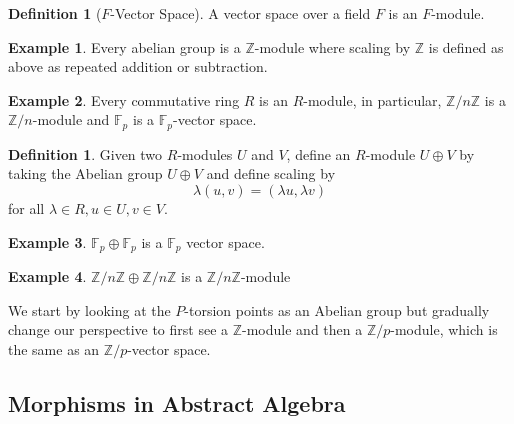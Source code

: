 \documentclass{article}
\theoremstyle{definition}
\newtheorem{definition}{Definition}[section]
\theoremstyle{definition}
\newtheorem{defn}{Definition}[section]
\theoremstyle{definition}
\newtheorem{eg}{Example}[section]
\newcommand{\mat}{\operatorname{Mat}}
\newcommand{\Z}{\mathbb{Z}}
\newcommand{\F}{\mathbb{F}}
\begin{document}
\begin{definition} [$F$-Vector Space]
    A vector space over a field $F$ is an $F$-module.
    
\end{definition}




\begin{eg} Every abelian group is a $\Z$-module where  scaling by $\Z$ is defined as above  as repeated addition or subtraction.
\end{eg}
\begin{eg} Every commutative ring $R$ is an $R$-module, in particular,  $\Z/n\Z$ is a $\Z/n$-module and $\F_p$ is a $\F_p$-vector space.
\end{eg}

\begin{defn}
    Given two $R$-modules $U$ and $V$, define an $R$-module $U\oplus V$ by taking the Abelian group $U\oplus V$ and define scaling by
    $$\lambda(u,v)=(\lambda u,\lambda v)$$
    for all $\lambda\in R,u\in U,v\in V$.
\end{defn}
\begin{eg} $\F_p\oplus \F_p$ is a $\F_p$ vector space. %
\end{eg}
\begin{eg} $\Z/n\Z\oplus\Z/n\Z$ is a $\Z/n\Z$-module
\end{eg}


We start by looking at the $P$-torsion points as an Abelian group but gradually change our perspective to first see a $\Z$-module and then a $\Z/p$-module, which is the same as an $\Z/p$-vector space.



\subsection{Morphisms in Abstract Algebra}
\end{document}
